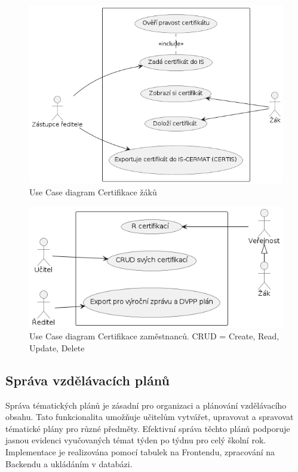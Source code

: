 \documentclass[FM,Proj]{tulthesis}
\begin{document}
\begin{figure}[H]
    \includegraphics[width=\textwidth-28pt]{uc-certifikace-zaku.png}
    \caption{Use Case diagram Certifikace žáků}
    \label{fig:uc-certifikace-zaku}
\end{figure}

\begin{figure}[H]
    \includegraphics[width=\textwidth-28pt]{uc-certifikace-zamestnancu.png}
    \caption{Use Case diagram Certifikace zaměstnanců. CRUD = Create, Read, 
             Update, Delete}
    \label{fig:uc-certifikace-zamestnancu}
\end{figure}

\subsection*{Správa vzdělávacích plánů}
Správa tématických plánů  je zásadní pro organizaci a plánování vzdělávacího obsahu.
Tato funkcionalita umožňuje učitelům vytvářet, upravovat a spravovat tématické plány
pro různé předměty. Efektivní správa těchto plánů podporuje jasnou evidenci vyučovaných
témat týden po týdnu pro celý školní rok. Implementace je realizována pomocí tabulek
na Frontendu, zpracování na Backendu a ukládáním v databázi.
\end{document}
